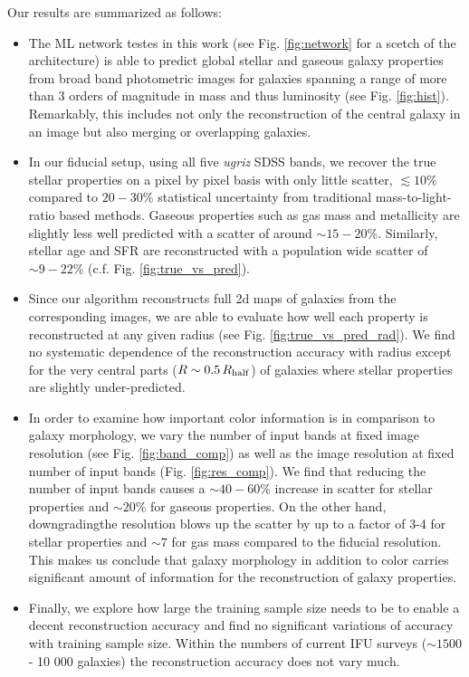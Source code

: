 \documentclass[conference]{IEEEtran}
\begin{document}
Our results are summarized as follows:
\begin{itemize}
\item The ML network testes in this work (see Fig. \ref{fig:network} for a scetch of the architecture) is able to predict global stellar and gaseous galaxy properties from broad band photometric images for galaxies spanning a range of more than 3 orders of magnitude in mass and thus luminosity (see Fig. \ref{fig:hist}). Remarkably, this includes not only the reconstruction of the central galaxy in an image but also merging or overlapping galaxies.  
\item In our fiducial setup, using all five \emph{ugriz} SDSS bands, we recover the true stellar properties on a pixel by pixel basis with only little scatter, $\lesssim10\%$ compared to $20-30\%$ statistical uncertainty from traditional mass-to-light-ratio based methods. Gaseous properties such as gas mass and metallicity are slightly less well predicted with a scatter of around $\sim15-20\%$. Similarly, stellar age and SFR are reconstructed with a population wide scatter of $\sim9-22\%$ (c.f. Fig. \ref{fig:true_vs_pred}).
\item Since our algorithm reconstructs full 2d maps of galaxies from the corresponding images, we are able to evaluate how well each property is reconstructed at any given radius (see Fig. \ref{fig:true_vs_pred_rad}). We find no systematic dependence of the reconstruction accuracy with radius except for the very central parts ($R\sim0.5\,R_{\rm half}$) of galaxies where stellar properties are slightly under-predicted.   
\item In order to examine how important color information is in comparison to galaxy morphology, we vary the number of input bands at fixed image resolution (see Fig. \ref{fig:band_comp}) as well as the image resolution at fixed number of input bands (Fig. \ref{fig:res_comp}). We find that reducing the number of input bands causes a $\sim40-60\%$ increase in scatter for stellar properties and $\sim20\%$ for gaseous properties. On the other hand, downgradingthe resolution blows up the scatter by up to a factor of 3-4 for stellar properties and $\sim7$ for gas mass compared to the fiducial resolution. This makes us conclude that galaxy morphology in addition to color carries significant amount of information for the reconstruction of galaxy properties.
\item Finally, we explore how large the training sample size needs to be to enable a decent reconstruction accuracy and find no significant variations of accuracy with training sample size. Within the numbers of current IFU surveys ($\sim1500$ - 10 000 galaxies) the reconstruction accuracy does not vary much.  
\end{itemize} 
\end{document}
